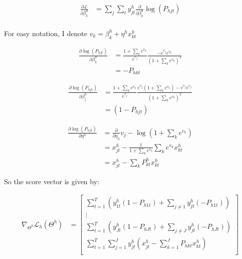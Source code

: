 \documentclass[12pt]{article}
\theoremstyle{plain}
\begin{document}
\begin{align*}
  \frac{\partial \mathcal{L}}{\partial \beta_k^h} &= \sum_j \sum_t y_{jt}^h \frac{\partial}{\partial \beta_k^h} \log(P_{hjt}) \\
\end{align*}

For easy notation, I denote $v_k = \beta_k^h + \eta^h x_{kt}^h$


\begin{align*}
  \frac{\partial \log(P_{hjt})}{\partial \beta_k^h} &= \frac{1 + \sum_k e^{v_k}}{e^{v_j}} \frac{- e^{v_j}e^{v_k}}{(1+\sum_k e^{v_k})^2} \\
  &= -P_{hkt}
\end{align*}


\begin{align*}
  \frac{\partial \log(P_{hjt})}{\partial \beta_j^h} &= \frac{1 + \sum_k e^{v_k}}{e^{v_j}} \frac{e^{v_j} (1+\sum_k e^{v_k}) - e^{v_j}e^{v_j}}{(1+\sum_k e^{v_k})^2} \\
  &= (1-P_{hjt})
\end{align*}

\begin{align*}
  \frac{\partial \log(P_{hjt})}{\partial \eta^h} &= \frac{\partial}{\partial \eta_h} v_j - \log(1+\sum_k e^{v_k}) \\
  &= x_{jt}^h - \frac{1}{1+\sum_k e^{v_k}} \sum_k e^{v_k} x_{kt}^h \\
  &= x_{jt}^h - \sum_k P_{kt}^h x_{kt}^h
\end{align*}

So the score vector is given by:

\begin{align*}
  \nabla_{\Theta^h} \mathcal{L}_h(\Theta^h) &= \begin{bmatrix}
    \sum_{t=1}^T \left( y_{1t}^h (1 - P_{h1t}) + \sum_{j \neq 1} y_{jt}^h (-P_{h1t}) \right) \\
    \vdots \\
    \sum_{t=1}^T \left( y_{Jt}^h (1 - P_{hJt}) + \sum_{j \neq J} y_{jt}^h (-P_{hJt}) \right) \\
    \sum_{t=1}^T \sum_{j=1}^J y_{jt}^h \left( x_{jt}^h - \sum_{k=1}^J P_{hkt} x_{kt}^h \right) \\
  \end{bmatrix}
\end{align*}
\end{document}

